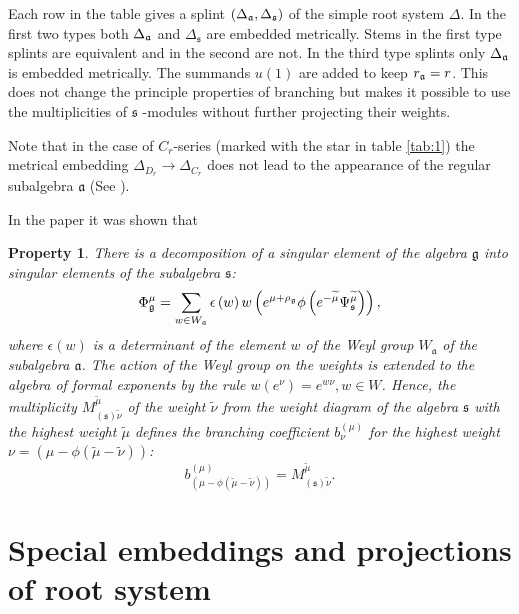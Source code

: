 \documentclass[12pt]{iopart}
\newtheorem{Prop}[Def]{Property}
\newcommand{\gf}{\mathfrak{g}}
\newcommand{\af}{\mathfrak{a}}
\newcommand{\sfr}{\mathfrak{s}}
\begin{document}
Each row in the table gives a splint $(\Delta _{\frak{a}},\Delta _{\sfr})
$ of the simple root system $\Delta $. In the first two types both $\Delta _{%
\frak{a}}$ and $\Delta _{\sfr}$ are embedded metrically. Stems in the
first type splints are equivalent and in the second are not. In the third
type splints only $\Delta _{\frak{a}}$ is embedded metrically. The summands $%
u\left( 1\right) $ are added to keep $r_{\frak{a}}=r$. This does not change
the principle properties of branching but makes it possible to use the
multiplicities of $\sfr$ -modules without further projecting their
weights.

Note that in the case of $C_{r}$-series (marked with the star in table \ref{tab:1}) the metrical
embedding $\Delta_{D_{r}}\to \Delta_{C_{r}}$ does not lead to the appearance of the regular subalgebra
$\mathfrak{a}$ (See \cite{dynkin1952semisimple}).

In the paper \cite{2011arXiv1102.1702L} it was shown that

\begin{Prop}
There is a decomposition of a singular element of the algebra $\gf$ into singular elements of the subalgebra $\sfr$:
\begin{equation}
 \Phi ^{\mu }_{\gf} = \sum_{w\in W_{\frak{a}}}\epsilon\left( w\right)w\left( e^{\mu +\rho _{\gf}}\phi\left( e^{-\widetilde{\mu }}\Psi^{\widetilde{\mu }}_{\sfr}\right)\right),
\end{equation}
where $\epsilon\left( w\right)$ is a determinant of the element $w$ of the Weyl group $W_{\af}$ of
the subalgebra $\af$. The action of the Weyl group on the weights is extended to the algebra of formal
exponents by the rule $w\left(e^{\nu}\right)=e^{w\nu}, w\in W$. Hence, the multiplicity $M_{\left(
      \sfr\right) \widetilde{\nu }}^{\widetilde{\mu }}$ of the weight $\widetilde{\nu }$ from the
  weight diagram of the algebra $\sfr$ with the highest weight $\tilde\mu$ defines the branching
  coefficient $b_{\nu }^{(\mu )}$ for the highest weight $\nu =\left( \mu -\phi \left(
      \widetilde{\mu }-\widetilde{\nu }\right) \right) $:
\begin{equation}
b_{\left( \mu -\phi \left( \widetilde{\mu }-\widetilde{\nu }\right) \right)
}^{(\mu )}=M_{\left( \sfr\right) \widetilde{\nu }}^{\widetilde{\mu }}. 
\label{bran1}
\end{equation}
\end{Prop} 



\section{Special embeddings and projections of root system}
\label{sec:spec-embedd-proj}
\end{document}
